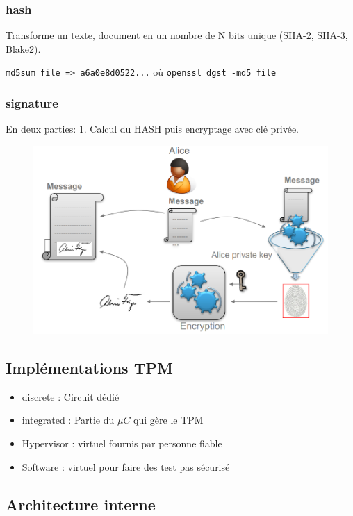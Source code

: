 \documentclass[resume]{subfiles}
\begin{document}
\subsubsection{hash}

Transforme un texte, document en un nombre de N bits unique (SHA-2, SHA-3, Blake2).

\verb!md5sum file => a6a0e8d0522...! 
où
\verb!openssl dgst -md5 file!  

\subsubsection{signature}
\label{sec_sign}
En deux parties: 1. Calcul du HASH puis encryptage avec clé privée. 
\begin{figure}[H]
    \centering
    \includegraphics[width=0.7\columnwidth]{Figures/TPM/signature.png}
\end{figure}

\subsection{Implémentations TPM}
\begin{itemize}
\item discrete : Circuit dédié 
\item integrated : Partie du $\mu C$ qui gère le TPM
\item Hypervisor : virtuel fournis par personne fiable
\item Software : virtuel pour faire des test pas sécurisé
\end{itemize}

\subsection{Architecture interne}
\end{document}
